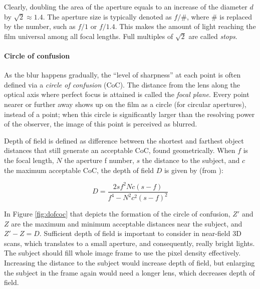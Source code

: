 Clearly, doubling the area of the aperture equals to an increase of the diameter $d$ by $\sqrt 2 \approx 1.4$.
The aperture size is typically denoted as $f/\#$, where $\#$ is replaced by the number, such as $f/1$ or $f/1.4$.
This makes the amount of light reaching the film universal among all focal lengths.
Full multiples of $\sqrt 2$ are called \emph{stops}.
\cite{szeliski10vision}

\paragraph{Circle of confusion}
As the blur happens gradually, the ``level of sharpness'' at each point is often defined via a \emph{circle of confusion} (CoC).
The distance from the lens along the optical axis where perfect focus is attained is called the \emph{focal plane}.
Every point nearer or further away shows up on the film as a circle (for circular apertures), instead of a point; when this circle is significantly larger than the resolving power of the observer, the image of this point is perceived as blurred.
\cite{szeliski10vision,greenleaf1950photographic}

Depth of field is defined as difference between the shortest and farthest object distances that still generate an acceptable CoC, found geometrically.
When $f$ is the focal length, $N$ the aperture f number, $s$ the distance to the subject, and $c$ the maximum acceptable CoC, the depth of field $D$ is given by (from \cite{greenleaf1950photographic}):

\begin{equation} \label{eq:dof}
	D = \frac{2 s f^2 N c (s - f)} {f^4 - N^2 c^2 (s - f)^2}
\end{equation}



In Figure \ref{fig:dofcoc} that depicts the formation of the circle of confusion, $Z'$ and $Z$ are the maximum and minimum acceptable distances near the subject, and $Z' - Z = D$.
Sufficient depth of field is important to consider in near-field 3D scans, which translates to a small aperture, and consequently, really bright lights.
The subject should fill whole image frame to use the pixel density effectively.
Increasing the distance to the subject would increase depth of field, but enlarging the subject in the frame again would need a longer lens, which decreases depth of field.

